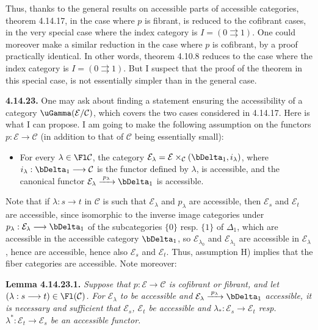 Thus, thanks to the general results on accessible parts of accessible categories, theorem 4.14.17, in the case where $p$ is fibrant, is reduced to the cofibrant cases, in the very special case where the index category is $I=(0\rightrightarrows 1)$. One could moreover make a similar reduction in the case where $p$ is cofibrant, by a proof practically %
identical. In other words, theorem 4.10.8 reduces to the case where the index category is $I=(0\rightrightarrows 1)$. But I suspect that the proof of the theorem in this special case, is not essentially simpler than in the general case.


\textbf{4.14.23.} One may ask about finding a statement ensuring the accessibility of a category $\uGamma(\mathcal{E}/\mathcal{C})$, which covers the two cases considered in 4.14.17. Here is what I can propose. I am going to make the following assumption on the functors $p:\mathcal{E}\longrightarrow\mathcal{C}$ (in addition to that of $\mathcal{C}$ being essentially small): %

\begin{itemize}[leftmargin=*]
\item[H)] For every $\lambda\in\Fl\mathcal{C}$, the category $\mathcal{E}_\lambda=\mathcal{E}\times_{\mathcal{C}}(\bDelta_1,i_\lambda)$, where $i_\lambda:\bDelta_1\longrightarrow\mathcal{C}$ is the functor defined by $\lambda$, is accessible, and the canonical functor $\mathcal{E}_\lambda\xrightarrow{\;p_\lambda\;}\bDelta_1$ is accessible.
\end{itemize}

Note that if $\lambda:s\longrightarrow t$ in $\mathcal{C}$ is such that $\mathcal{E}_\lambda$ and $p_\lambda$ are accessible, then $\mathcal{E}_s$ and $\mathcal{E}_t$ are accessible, since isomorphic to the inverse image categories under $p_\lambda:\mathcal{E}_\lambda\longrightarrow\bDelta_1$ of the subcategories $\{0\}$ resp. $\{1\}$ of $\Delta_1$, which are accessible in the accessible category $\bDelta_1$, so %
$\mathcal{E}_{\lambda_0}$ and $\mathcal{E}_{\lambda_1}$ are accessible in $\mathcal{E}_\lambda$, hence are accessible, hence also $\mathcal{E}_s$ and $\mathcal{E}_t$. Thus, assumption H) implies that the fiber categories are accessible. Note moreover:

\textbf{Lemma 4.14.23.1.} \textit{Suppose that $p:\mathcal{E}\longrightarrow\mathcal{C}$ is cofibrant or fibrant, and let $(\lambda:s\longrightarrow t)\in\Fl(\mathcal{C})$. For $\mathcal{E}_\lambda$ to be accessible and $\mathcal{E}_\lambda\xrightarrow{\;p_\lambda\;}\bDelta_1$ accessible, it is necessary and sufficient that $\mathcal{E}_s$, $\mathcal{E}_t$ be accessible and $\lambda_*:\mathcal{E}_s\longrightarrow\mathcal{E}_t$ resp. $\lambda^*:\mathcal{E}_t\longrightarrow\mathcal{E}_s$ be an accessible functor.}

